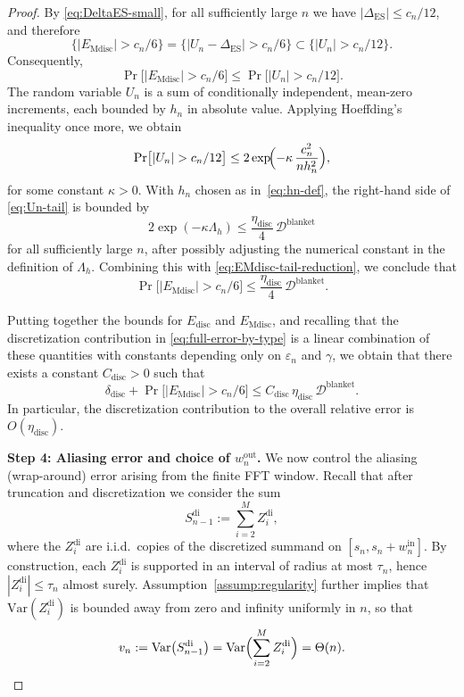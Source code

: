 \documentclass{article}
\theoremstyle{plain}
\theoremstyle{definition}
\begin{document}
\begin{proof}
By \eqref{eq:DeltaES-small}, for all sufficiently large $n$ we have
$|\Delta_{\mathrm{ES}}|\le c_n/12$, and therefore
\[
  \bigl\{|E_{\mathrm{Mdisc}}|>c_n/6\bigr\}
  =
  \bigl\{|U_n - \Delta_{\mathrm{ES}}|>c_n/6\bigr\}
  \subset
  \bigl\{|U_n|>c_n/12\bigr\}.
\]
Consequently,
\begin{equation}
  \label{eq:EMdisc-tail-reduction}
  \Pr\bigl[|E_{\mathrm{Mdisc}}|>c_n/6\bigr]
  \le
  \Pr\bigl[|U_n|>c_n/12\bigr].
\end{equation}
The random variable $U_n$ is a sum of conditionally independent,
mean-zero increments, each bounded by $h_n$ in absolute value.
Applying Hoeffding's inequality once more, we obtain
\begin{equation}
  \label{eq:Un-tail}
  \Pr\bigl[|U_n|>c_n/12\bigr]
  \le
  2\exp\!\Bigl(
    -\kappa\,
    \frac{c_n^2}{n h_n^2}
  \Bigr),
\end{equation}
for some constant $\kappa>0$.
With $h_n$ chosen as in~\eqref{eq:hn-def}, the right-hand side of
\eqref{eq:Un-tail} is bounded by
\[
  2\exp(-\kappa \Lambda_h)
  \le
  \frac{\eta_{\mathrm{disc}}}{4}\,\mathcal{D}^{\mathrm{blanket}}
\]
for all sufficiently large $n$, after possibly adjusting the numerical
constant in the definition of $\Lambda_h$.
Combining this with \eqref{eq:EMdisc-tail-reduction}, we conclude that
\begin{equation}
  \label{eq:EMdisc-vs-Dblanket}
  \Pr\bigl[|E_{\mathrm{Mdisc}}|>c_n/6\bigr]
  \le
  \frac{\eta_{\mathrm{disc}}}{4}\,\mathcal{D}^{\mathrm{blanket}}.
\end{equation}

\medskip

Putting together the bounds for $E_{\mathrm{disc}}$ and
$E_{\mathrm{Mdisc}}$, and recalling that the discretization contribution
in \eqref{eq:full-error-by-type} is a linear combination of these
quantities with constants depending only on $\varepsilon_n$ and
$\gamma$, we obtain that there exists a constant $C_{\mathrm{disc}}>0$
such that
\[
  \delta_{\mathrm{disc}}
  +
  \Pr\bigl[|E_{\mathrm{Mdisc}}|>c_n/6\bigr]
  \le
  C_{\mathrm{disc}}\,
  \eta_{\mathrm{disc}}\,
  \mathcal{D}^{\mathrm{blanket}}.
\]
In particular, the discretization contribution to the overall relative
error is $O(\eta_{\mathrm{disc}})$.

\medskip

\noindent

\textbf{Step 4: Aliasing error and choice of $w_n^{\mathrm{out}}$.}
We now control the aliasing (wrap-around) error arising from the finite
FFT window. Recall that after truncation and discretization we consider
the sum
\[
  S_{n-1}^{\mathrm{di}}
  :=
  \sum_{i=2}^M Z_i^{\mathrm{di}},
\]
where the $Z_i^{\mathrm{di}}$ are i.i.d.\ copies of the discretized
summand on $[s_n,s_n+w_n^{\mathrm{in}}]$.
By construction, each $Z_i^{\mathrm{di}}$ is supported in an interval of
radius at most $\tau_n$, hence
$|Z_i^{\mathrm{di}}|\le \tau_n$ almost surely.
Assumption~\ref{assump:regularity} further implies that
$\mathrm{Var}(Z_i^{\mathrm{di}})$ is bounded away from zero and infinity
uniformly in $n$, so that
\[
  v_n
  :=
  \mathrm{Var}\bigl(S_{n-1}^{\mathrm{di}}\bigr)
  =
  \mathrm{Var}\Bigl(\sum_{i=2}^M Z_i^{\mathrm{di}}\Bigr)
  = \Theta(n).
\]


\end{proof}
\end{document}
